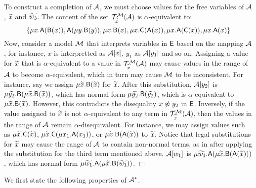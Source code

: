 \begin{example}
To construct a completion of $\mathcal{A}$, we must choose values for the free variables of $\mathcal{A}$, ${\widetilde{x}}$ and ${\widetilde{w_3}}$.
The content of the set $\mathcal{T}^{\mathcal{M}}_{{\widetilde{x}}}( \mathcal{A} )$ is $\alpha$-equivalent to:
\[%
\{
\mu x. \const{A}( \const{B}( x )),
\const{A}( \mu y. \const{B}( y )),
\mu x. \const{B}( x ),
\mu x. \const{C}( \const{A}( x )),
\mu x. \const{A}( \const{C}( x )),
\mu x. \const{A}( x )
\}
\]
Now, consider a model $\mathcal{M}$ that interprets variables in $\mathsf{E}$ based on the mapping $\mathcal{A}$,
for instance, $x$ is interpretted as $\mathcal{A} [x]$, $y_1$ as $\mathcal{A} [y_1]$ and so on.
Assigning a value for ${\widetilde{x}}$ that is $\alpha$-equivalent to a value in $\mathcal{T}^{\mathcal{M}}_{{\widetilde{x}}}( \mathcal{A} )$
may cause values in the range of $\mathcal{A}$ to become $\alpha$-equivalent, 
which in turn may cause $\mathcal{M}$ to be inconsistent.
For instance, say we assign $\mu {\widetilde{x}}. \textsf{B}( {\widetilde{x}} )$ for ${\widetilde{x}}$.
After this substitution, $\mathcal{A} [y_2]$ is $\mu {\widetilde{y_2}}. \textsf{B}( \mu {\widetilde{x}}. \textsf{B}( {\widetilde{x}} ) )$, 
which has normal form $\mu {\widetilde{y_2}}. \textsf{B}( {\widetilde{y_2}} )$,
which is $\alpha$-equivalent to $\mu {\widetilde{x}}. \textsf{B}( {\widetilde{x}} )$.
However, this contradicts the disequality $x \not\approx y_2$ in $\mathsf{E}$.
Inversely, if the value assigned to ${\widetilde{x}}$ is not $\alpha$-equivalent to any term in $\mathcal{T}^{\mathcal{M}}_{{\widetilde{x}}}( \mathcal{A} )$,
then the values in the range of $\mathcal{A}$ remain $\alpha$-disequivalent.
For instance, we may assign values such as 
$\mu {\widetilde{x}}. \textsf{C}( {\widetilde{x}} )$,
$\mu {\widetilde{x}}. \textsf{C}( \mu x_1. \textsf{A}( x_1) )$, or
$\mu {\widetilde{x}}. \textsf{B}( \textsf{A}( {\widetilde{x}} ) )$
to ${\widetilde{x}}$.
Notice that legal substitutions for ${\widetilde{x}}$ may cause the range of $\mathcal{A}$ to contain non-normal terms,
as in after applying the substitution for the third term mentioned above,
$\mathcal{A} [w_1]$ is $\mu {\widetilde{w_1}}. \textsf{A}( \mu {\widetilde{x}}. \textsf{B}( \textsf{A}( {\widetilde{x}} ) ) )$,
which has normal form
$\mu {\widetilde{w_1}}. \textsf{A}( \mu {\widetilde{x}}. \textsf{B}( {\widetilde{w_1}} ) )$.
$\Box$
\end{example}

We first state the following properties of $\mathcal{A}^\ast$.

